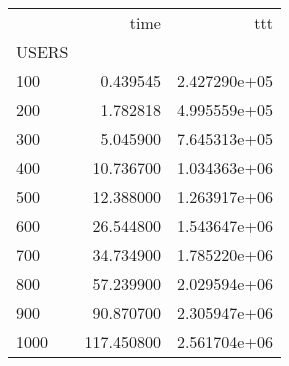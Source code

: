 \begin{tabular}{lrr}
\toprule
{} &        time &           ttt \\
USERS &             &               \\
\midrule
100   &    0.439545 &  2.427290e+05 \\
200   &    1.782818 &  4.995559e+05 \\
300   &    5.045900 &  7.645313e+05 \\
400   &   10.736700 &  1.034363e+06 \\
500   &   12.388000 &  1.263917e+06 \\
600   &   26.544800 &  1.543647e+06 \\
700   &   34.734900 &  1.785220e+06 \\
800   &   57.239900 &  2.029594e+06 \\
900   &   90.870700 &  2.305947e+06 \\
1000  &  117.450800 &  2.561704e+06 \\
\bottomrule
\end{tabular}
